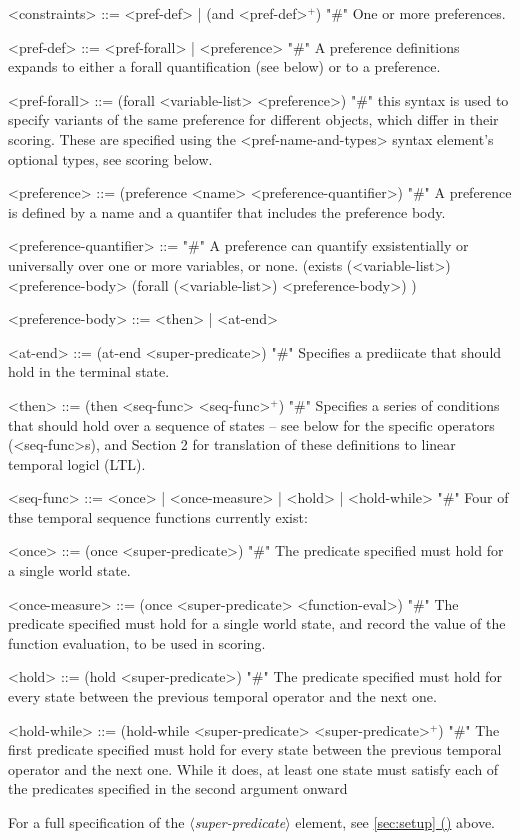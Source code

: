 \documentclass{article}
\newcommand{\dsl}[1]{{\it $\langle$#1$\rangle$}}
\newcommand*{\fullref}[1]{\hyperref[{#1}]{\autoref*{#1} (\nameref*{#1})}} %
\begin{document}
\begin{grammar}
<constraints> ::= <pref-def> | (and <pref-def>$^+$)  "#" One or more preferences.

<pref-def> ::= <pref-forall> | <preference> "#" A preference definitions expands to either a forall quantification (see below) or to a preference.

<pref-forall> ::= (forall <variable-list> <preference>) "#" this syntax is used to specify variants of the same preference for different objects, which differ in their scoring. These are specified using the <pref-name-and-types> syntax element's optional types, see scoring below.

<preference> ::= (preference <name> <preference-quantifier>) "#" A preference is defined by a name and a quantifer that includes the preference body.

<preference-quantifier> ::= "#" A preference can quantify exsistentially or universally over one or more variables, or none.
\alt (exists (<variable-list>) <preference-body>
\alt  (forall (<variable-list>) <preference-body>)
)

<preference-body> ::=  <then> | <at-end>

<at-end> ::= (at-end <super-predicate>) "#" Specifies a prediicate that should hold in the terminal state.

<then> ::= (then <seq-func> <seq-func>$^+$) "#" Specifies a series of conditions that should hold over a sequence of states -- see below for the specific operators (<seq-func>s), and Section 2 for translation of these definitions to linear temporal logicl (LTL).

<seq-func> ::= <once> | <once-measure> | <hold> | <hold-while> "#" Four of thse temporal sequence functions currently exist:

<once> ::= (once <super-predicate>) "#" The predicate specified must hold for a single world state.

<once-measure> ::= (once <super-predicate> <function-eval>) "#" The predicate specified must hold for a single world state, and record the value of the function evaluation, to be used in scoring.

<hold> ::= (hold <super-predicate>) "#" The predicate specified must hold for every state between the previous temporal operator and the next one.

<hold-while> ::= (hold-while <super-predicate> <super-predicate>$^+$) "#" The first predicate specified must hold for every state between the previous temporal operator and the next one. While it does, at least one state must satisfy each of the predicates specified in the second argument onward



\end{grammar}
For a full specification of the \dsl{super-predicate} element, see \fullref{sec:setup} above.
\end{document}
